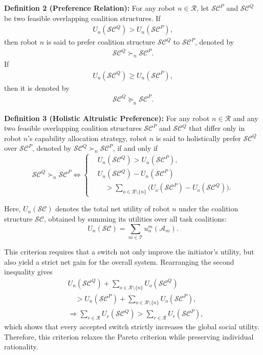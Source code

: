 \documentclass[journal,twoside,web]{ieeecolor}
\begin{document}
\textbf{Definition 2 (Preference Relation):}
For any robot $n\in\mathcal{R}$, let $\mathcal{SC}^P$ and $\mathcal{SC}^Q$ be two feasible overlapping coalition structures. If
\begin{align}
U_n(\mathcal{SC}^Q)>U_n(\mathcal{SC}^P),
\end{align}
then robot $n$ is said to prefer coalition structure $\mathcal{SC}^Q$ to $\mathcal{SC}^P$, denoted by
\begin{align}
\mathcal{SC}^Q \succ_n \mathcal{SC}^P.
\end{align}
If
\begin{align}
U_n(\mathcal{SC}^Q)\ge U_n(\mathcal{SC}^P),
\end{align}
then it is denoted by
\begin{align}
\mathcal{SC}^Q \succeq_n \mathcal{SC}^P.
\end{align}

\textbf{Definition 3 (Holistic Altruistic Preference)\cite{fang2026game}:}
For any robot $n \in \mathcal{R}$ and any two feasible overlapping coalition structures $\mathcal{SC}^P$ and $\mathcal{SC}^Q$ that differ only in robot $n$'s capability allocation strategy, robot $n$ is said to holistically prefer $\mathcal{SC}^Q$ over $\mathcal{SC}^P$, denoted by $\mathcal{SC}^Q \succ_n \mathcal{SC}^P$, if and only if
\begin{equation}
\mathcal{SC}^Q \succ_n \mathcal{SC}^P \iff
\left\{
\begin{aligned}
&U_n(\mathcal{SC}^Q) > U_n(\mathcal{SC}^P), \\
&U_n(\mathcal{SC}^Q) - U_n(\mathcal{SC}^P) \\
&\quad > \sum_{o \in \mathcal R\setminus\{n\}}
\bigl(U_o(\mathcal{SC}^P)-U_o(\mathcal{SC}^Q)\bigr).
\end{aligned}
\right.
\label{eq:altruistic_preference}
\end{equation}

Here, $U_n(\mathcal{SC})$ denotes the total net utility of robot $n$ under the coalition structure $\mathcal{SC}$, obtained by summing its utilities over all task coalitions:
\begin{equation}
U_n(\mathcal{SC}) = \sum_{m \in \mathcal{T}} u_n^m(\mathcal{A}_m).
\label{eq:individual_total_utility_SC}
\end{equation}

This criterion requires that a switch not only improve the initiator's utility, but also yield a strict net gain for the overall system. Rearranging the second inequality gives
\begin{align}
&U_n(\mathcal{SC}^Q) + \sum_{o \in \mathcal{R} \setminus \{n\}} U_o(\mathcal{SC}^Q) \nonumber \\
&\quad > U_n(\mathcal{SC}^P) + \sum_{o \in \mathcal{R} \setminus \{n\}} U_o(\mathcal{SC}^P), \nonumber \\
&\Rightarrow \sum_{r \in \mathcal{R}} U_r(\mathcal{SC}^Q) > \sum_{r \in \mathcal{R}} U_r(\mathcal{SC}^P),
\end{align}
which shows that every accepted switch strictly increases the global social utility. Therefore, this criterion relaxes the Pareto criterion while preserving individual rationality.
\end{document}
